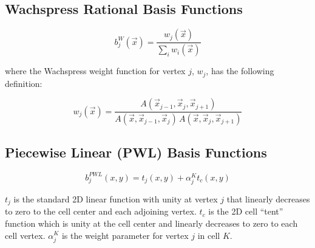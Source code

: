 \subsection{Wachspress Rational Basis Functions}
\label{sec::BF_2DLinear_Wachspress}

\begin{equation}
\label{eq::BF_wach_BF}
b_{j}^{W} (\vec{x}) = \frac{w_j (\vec{x}) }{\sum_i w_i (\vec{x})}
\end{equation}

\noindent where the Wachspress weight function for vertex $j$, $w_j$, has the following definition:

\begin{equation}
\label{eq::BF_wach_weights}
w_j (\vec{x})  = \frac{A(\vec{x}_{j-1}, \vec{x}_{j}, \vec{x}_{j+1})}{A(\vec{x}, \vec{x}_{j-1}, \vec{x}_{j}) \, A(\vec{x}, \vec{x}_{j}, \vec{x}_{j+1})}
\end{equation}

\subsection{Piecewise Linear (PWL) Basis Functions}
\label{sec::BF_2DLinear_PWL}

\begin{equation}
\label{eq::PWL_2D}
	b_j^{PWL} (x,y) = t_j (x,y) + \alpha_j^K t_c (x,y)
\end{equation}

\noindent $t_j$ is the standard 2D linear function with unity at vertex $j$ that linearly decreases to zero to the cell center and each adjoining vertex. $t_c$ is the 2D cell ``tent'' function which is unity at the cell center and linearly decreases to zero to each cell vertex. $\alpha_{j}^{K}$ is the weight parameter for vertex $j$ in cell $K$. 



